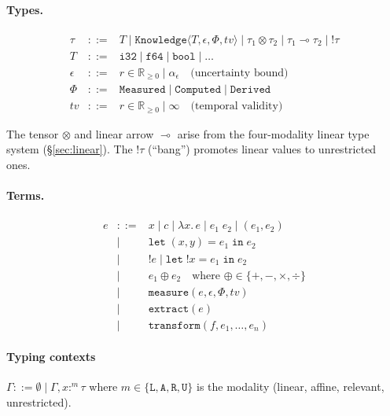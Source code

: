 \documentclass[acmsmall,screen,review,anonymous]{acmart}
\newcommand{\knowfull}[4]{\texttt{Knowledge}\langle #1, #2, #3, #4 \rangle}
\newcommand{\eps}{\epsilon}
\begin{document}
\paragraph{Types.}
\[
\begin{array}{rcl}
\tau & ::= & T \mid \knowfull{T}{\eps}{\Phi}{\mathit{tv}} \mid \tau_1 \otimes \tau_2
         \mid \tau_1 \multimap \tau_2 \mid !\tau \\
T & ::= & \texttt{i32} \mid \texttt{f64} \mid \texttt{bool} \mid \ldots \\
\eps & ::= & r \in \mathbb{R}_{\geq 0} \mid \alpha_\eps \quad \text{(uncertainty bound)} \\
\Phi & ::= & \texttt{Measured} \mid \texttt{Computed} \mid \texttt{Derived} \\
\mathit{tv} & ::= & r \in \mathbb{R}_{\geq 0} \mid \infty \quad \text{(temporal validity)}
\end{array}
\]

The tensor $\otimes$ and linear arrow $\multimap$ arise from the
four-modality linear type system (\S\ref{sec:linear}).
The $!\tau$ (``bang'') promotes linear values to unrestricted ones.

\paragraph{Terms.}
\[
\begin{array}{rcl}
e & ::= & x \mid c \mid \lambda x.\, e \mid e_1\; e_2 \mid (e_1, e_2) \\
  & \mid & \texttt{let}\; (x,y) = e_1 \;\texttt{in}\; e_2 \\
  & \mid & !e \mid \texttt{let}\; !x = e_1 \;\texttt{in}\; e_2 \\
  & \mid & e_1 \oplus e_2 \quad \text{where } \oplus \in \{+, -, \times, \div\} \\
  & \mid & \texttt{measure}(e, \eps, \Phi, \mathit{tv}) \\
  & \mid & \texttt{extract}(e) \\
  & \mid & \texttt{transform}(f, e_1, \ldots, e_n)
\end{array}
\]

\paragraph{Typing contexts} $\Gamma ::= \emptyset \mid \Gamma, x :^m \tau$
where $m \in \{\texttt{L}, \texttt{A}, \texttt{R}, \texttt{U}\}$ is
the modality (linear, affine, relevant, unrestricted).
\end{document}
